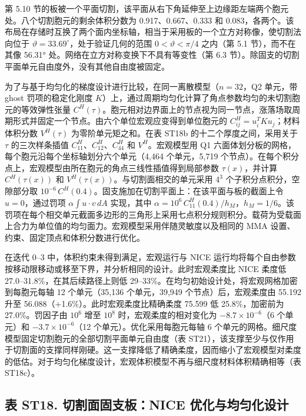 \documentclass[preprint,12pt,authoryear]{elsarticle}
\begin{document}
第 5.10 节的板被一个平面切割，该平面从右下角延伸至上边缘距左端两个胞元处。八个切割胞元的剩余体积分数为 0.917、0.667、0.333 和 0.083，各两个。该布局在存储时互换了两个面内坐标轴，相当于采用板的一个立方对称像，使切割法向位于 \(\vartheta=33.69^\circ\)，处于验证几何的范围 \(0<\vartheta<\pi/4\) 之内（第 5.1 节），而不在其像 56.31° 处。网络在立方对称变换下不具有等变性（第 6.3 节）。除固支的切割平面单元自由度外，没有其他自由度被固定。

为了与基于均匀化的梯度设计进行比较，在同一离散模型（\(n=32\)，Q2 单元，带 ghost 罚项的稳定化刚度 \(K\)）上，通过周期均匀化计算了角点参数均匀的未切割胞元的等效弹性张量 \(C^H(\tau)\)。胞元相对边界面上的节点视为同一节点，涨落场取周期形式并固定一个节点。由六个单位宏观应变得到单位胞元的 \(C^H_{ij}=u_i^TKu_j\)；材料体积分数 \(V^H(\tau)\) 为零阶单元矩之和。在表 ST18b 的十二个厚度之间，采用关于 \(\tau\) 的三次样条插值 \(C^H_{11}\)、\(C^H_{12}\)、\(C^H_{44}\) 和 \(V^H\)。宏观模型用 Q1 六面体划分板的网格，每个胞元沿每个坐标轴划分六个单元（4,464 个单元，5,719 个节点）。在每个积分点上，宏观模型由所在胞元的角点三线性插值得到局部参数 \(\tau(x)\)，并计算 \(C^H(\tau(x))\) 和 \(V^H(\tau(x))\)。与切割面相交的单元采用 \(4^3\) 个子积分点积分，空隙部分取 \(10^{-6}\,C^H(0.4)\)。固支施加在切割平面上：在该平面与板的截面上令 \(u=0\)，通过罚项 \(\alpha\int u\cdot v\,dA\) 实现，其中 \(\alpha=10^6\,C^H_{11}(0.4)/h_M\)，\(h_M=1/6\)。该罚项在每个相交单元截面多边形的三角形上采用七点积分规则积分。载荷为受载面上合力为单位值的均匀面力。宏观模型采用伴随灵敏度以及相同的 MMA 设置、约束、固定顶点和体积分数进行优化。

在迭代 0--3 中，体积约束未得到满足，宏观运行与 NICE 运行均将每个自由参数按移动限移动或移至下界，并分析相同的设计。此时宏观柔度比 NICE 柔度低 27.0--31.8\%，在其后续路径上则低 29--33\%。在均匀初始设计处，将宏观网格加密到每胞元每轴 12 个单元（35,136 个单元，39,949 个节点）后，宏观柔度由 55.192 升至 56.088（+1.6\%）。此时宏观柔度比精确柔度 75.599 低 25.8\%，加密前为 27.0\%。罚因子由 \(10^6\) 增至 \(10^8\) 时，宏观柔度的相对变化为 \(-8.7\times10^{-6}\)（6 个单元）和 \(-3.7\times10^{-6}\)（12 个单元）。优化采用每胞元每轴 6 个单元的网格。细尺度模型固定切割胞元的全部切割平面单元自由度（表 ST21），该支撑至少与仅作用于切割面的支撑同样刚硬。这一支撑降低了精确柔度，因而缩小了宏观模型对柔度的低估。对于均匀化梯度设计，宏观体积模型不再与细尺度材料体积精确相等（表 ST18c）。

\subsection{表 ST18. 切割面固支板：NICE 优化与均匀化设计}
\end{document}
